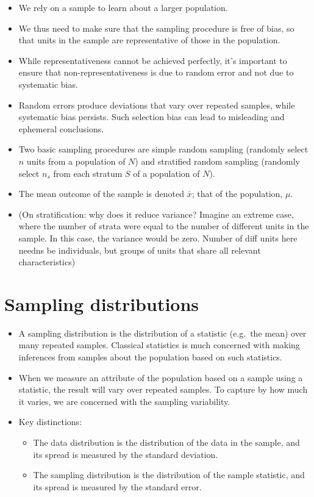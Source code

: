 \documentclass[
  letterpaper,
  DIV=11,
  numbers=noendperiod]{scrreprt}
\begin{document}
\begin{itemize}
\item
  We rely on a sample to learn about a larger population.
\item
  We thus need to make sure that the sampling procedure is free of bias,
  so that units in the sample are representative of those in the
  population.
\item
  While representativeness cannot be achieved perfectly, it's important
  to ensure that non-representativeness is due to random error and not
  due to systematic bias.
\item
  Random errors produce deviations that vary over repeated samples,
  while systematic bias persists. Such selection bias can lead to
  misleading and ephemeral conclusions.
\item
  Two basic sampling procedures are simple random sampling (randomly
  select \(n\) units from a population of \(N\)) and stratified random
  sampling (randomly select \(n_s\) from each stratum \(S\) of a
  population of \(N\)).
\item
  The mean outcome of the sample is denoted \(\bar{x}\); that of the
  population, \(\mu\).
\item
  (On stratification: why does it reduce variance? Imagine an extreme
  case, where the number of strata were equal to the number of different
  units in the sample. In this case, the variance would be zero. Number
  of diff units here needns be individuals, but groups of units that
  share all relevant characteristics)
\end{itemize}

\hypertarget{sampling-distributions}{%
\section{Sampling distributions}\label{sampling-distributions}}

\begin{itemize}
\item
  A sampling distribution is the distribution of a statistic (e.g.~the
  mean) over many repeated samples. Classical statistics is much
  concerned with making inferences from samples about the population
  based on such statistics.
\item
  When we measure an attribute of the population based on a sample using
  a statistic, the result will vary over repeated samples. To capture by
  how much it varies, we are concerned with the sampling variability.
\item
  Key distinctions:

  \begin{itemize}
  \item
    The data distribution is the distribution of the data in the sample,
    and its spread is measured by the standard deviation.
  \item
    The sampling distribution is the distribution of the sample
    statistic, and its spread is measured by the standard error.
  \end{itemize}
\end{itemize}
\end{document}
